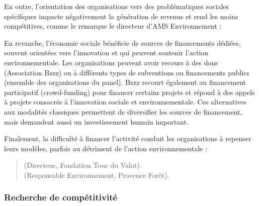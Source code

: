         En outre, l'orientation des organisations vers des problématiques sociales spécifiques impacte négativement la génération de revenus et rend les \oess moins compétitives, comme le remarque le directeur d'AMS Environnement : 

        En revanche, l'économie sociale bénéficie de sources de financements dédiées, souvent orientées vers l'innovation et qui peuvent soutenir l'action environnementale. Les organisations peuvent avoir recours à des dons (Association Bzzz) ou à différents types de subventions ou financements publics (ensemble des organisations du panel). Bzzz recourt également au financement participatif (crowd-funding) pour financer certains projets et répond à des appels à projets consacrés à l'innovation sociale et environnementale. Ces alternatives aux modalités classiques permettent de diversifier les sources de financement, mais demandent aussi un investissement humain important.

        Finalement, la difficulté à financer l'activité conduit les organisations à repenser leurs modèles, parfois au détriment de l'action environnementale :
        \begin{quotation}
             (Directeur, Fondation Tour du Valat). \\
             (Responsable Environnement, Provence Forêt).
        \end{quotation}



        \subsubsection{Recherche de compétitivité}

